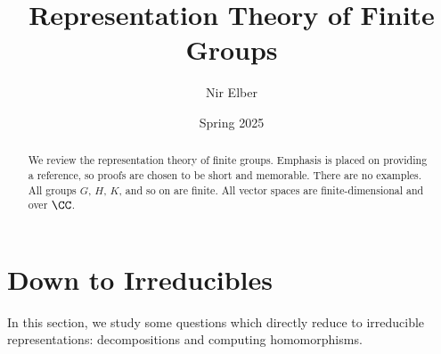 \documentclass{article}
\title{Representation Theory of Finite Groups}
\author{Nir Elber}
\date{Spring 2025}
\begin{document}
\maketitle

\begin{abstract}
	We review the representation theory of finite groups. Emphasis is placed on providing a reference, so proofs are chosen to be short and memorable. There are no examples. All groups $G$, $H$, $K$, and so on are finite. All vector spaces are finite-dimensional and over $\CC$.
\end{abstract}

\tableofcontents


\section{Down to Irreducibles}
In this section, we study some questions which directly reduce to irreducible representations: decompositions and computing homomorphisms.
\end{document}
